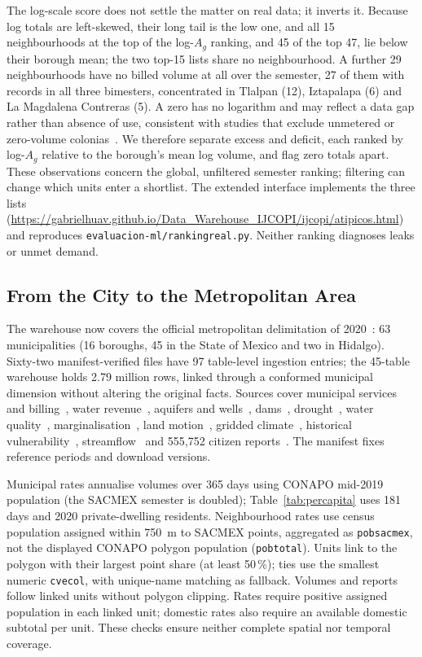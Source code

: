 \documentclass[runningheads]{llncs}
\newenvironment{nuevobloque}{}{}
\renewcommand{\_}{\origunderscore\allowbreak}
\begin{document}
\begin{nuevobloque}
The log-scale score does not settle the matter on real data; it inverts it.
Because log totals are left-skewed, their long tail is the low one, and all 15
neighbourhoods at the top of the log-$A_g$ ranking, and 45 of the top 47, lie
below their borough mean; the two top-15 lists share no neighbourhood. A further
29 neighbourhoods have no billed volume at all over the semester, 27 of them with
records in all three bimesters, concentrated in Tlalpan (12), Iztapalapa (6) and
La Magdalena Contreras (5). A zero has no logarithm and may reflect a data gap
rather than absence of use, consistent with studies that exclude unmetered or zero-volume
colonias~\cite{ramosbueno2021}. We therefore separate excess and deficit, each ranked by
log-$A_g$ relative to the borough's mean log volume, and flag zero totals apart.
These observations concern the global, unfiltered semester ranking; filtering can change
which units enter a shortlist. The extended interface implements the three lists
(\url{https://gabrielhuav.github.io/Data_Warehouse_IJCOPI/ijcopi/atipicos.html}) and
reproduces \texttt{evaluacion-ml/ranking\_real.py}. Neither ranking diagnoses leaks or unmet demand.

\subsection{From the City to the Metropolitan Area}
\label{sec:metro}

The warehouse now covers the official metropolitan delimitation of 2020~\cite{conapo2025b}: 63
municipalities (16 boroughs, 45 in the State of Mexico and two in Hidalgo). Sixty-two
manifest-verified files have 97 table-level ingestion entries; the 45-table warehouse
holds 2.79 million rows, linked through a conformed municipal dimension without altering
the original facts. Sources cover municipal services and
billing~\cite{inegicngmd}, water revenue~\cite{shcp2026}, aquifers and wells~\cite{conagua2026a},
dams~\cite{conagua2026b}, drought~\cite{smn2026}, water quality~\cite{conaguacalidad},
marginalisation~\cite{conapo2025a}, land motion~\cite{khorrami2023}, gridded climate~\cite{carrera2025},
historical vulnerability~\cite{huerta2022}, streamflow~\cite{hidromx2026} and 555,752 citizen
reports~\cite{sacmexreportes}. The manifest fixes reference periods and download versions.

Municipal rates annualise volumes over 365 days using CONAPO mid-2019 population
(the SACMEX semester is doubled); Table~\ref{tab:percapita} uses 181 days and 2020
private-dwelling residents. Neighbourhood rates use census population assigned within
750~m to SACMEX points, aggregated as \texttt{pob\_sacmex}, not the displayed CONAPO
polygon population (\texttt{pob\_total}). Units link to the polygon with their largest
point share (at least 50\,\%); ties use the smallest numeric \texttt{cve\_col}, with
unique-name matching as fallback. Volumes and reports follow linked units without
polygon clipping. Rates require positive assigned population in each linked unit;
domestic rates also require an available domestic subtotal per unit. These checks
ensure neither complete spatial nor temporal coverage.


\end{nuevobloque}
\end{document}
